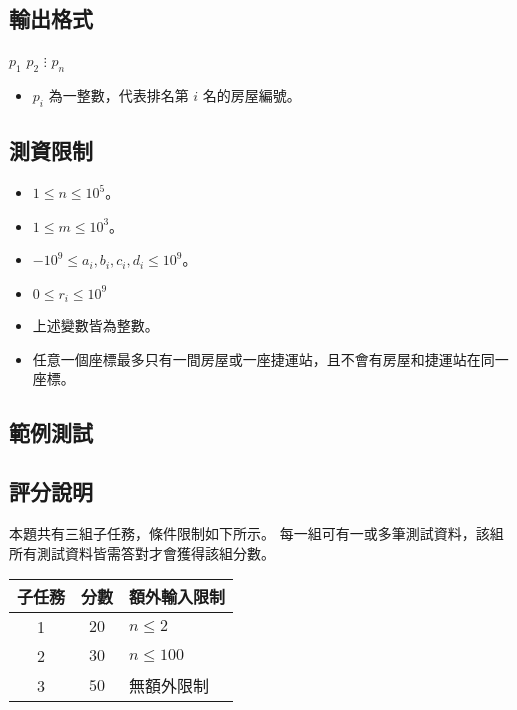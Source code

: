 \subsection{輸出格式}

\begin{format}
\f{
$p_1$
$p_2$
$\vdots$
$p_n$
}
\end{format}

\begin{itemize}
\tightlist
\item
  \(p_i\) 為一整數，代表排名第 \(i\) 名的房屋編號。
\end{itemize}

\subsection{測資限制}

\begin{itemize}
\tightlist
\item
  \(1 \le n \le 10^5\)。
\item
  \(1 \le m \le 10^3\)。
\item
  \(-10^9 \le a_i, b_i, c_i, d_i \le 10^9\)。
\item
  \(0 \le r_i \le 10^9\)
\item
  上述變數皆為整數。
\item
  任意一個座標最多只有一間房屋或一座捷運站，且不會有房屋和捷運站在同一座標。
\end{itemize}

\subsection{範例測試}

\begin{example}
%
%
\end{example}

\subsection{評分說明}

本題共有三組子任務，條件限制如下所示。
每一組可有一或多筆測試資料，該組所有測試資料皆需答對才會獲得該組分數。

\begin{longtable}[]{@{}ccl@{}}
\toprule
子任務 & 分數 & 額外輸入限制 \\
\midrule
\endhead
1 & \(20\) & \(n \le 2\) \\
2 & \(30\) & \(n \le 100\) \\
3 & \(50\) & 無額外限制 \\
\bottomrule
\end{longtable}

